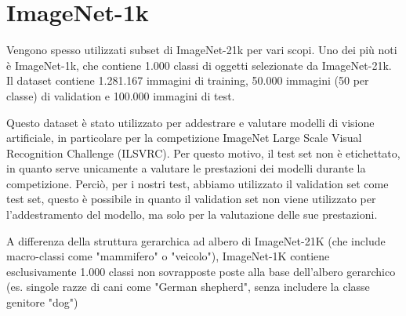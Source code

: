 \section{ImageNet-1k}
Vengono spesso utilizzati subset di ImageNet-21k per vari scopi. 
Uno dei più noti è ImageNet-1k, che contiene 1.000 classi di oggetti selezionate da ImageNet-21k. Il dataset contiene 1.281.167 immagini di training, 50.000 immagini (50 per classe) di validation e 100.000 immagini di test.

Questo dataset è stato utilizzato per addestrare e valutare modelli di visione artificiale, in particolare per la competizione ImageNet Large Scale Visual Recognition Challenge (ILSVRC). Per questo motivo, il test set non è etichettato, in quanto serve unicamente a valutare le prestazioni dei modelli durante la competizione. Perciò, per i nostri test, abbiamo utilizzato il validation set come test set, questo è possibile in quanto il validation set non viene utilizzato per l'addestramento del modello, ma solo per la valutazione delle sue prestazioni\cite{he_deep_2016}.

A differenza della struttura gerarchica ad albero di ImageNet-21K (che include macro-classi come "mammifero" o "veicolo"), ImageNet-1K contiene esclusivamente 1.000 classi non sovrapposte poste alla base dell'albero gerarchico (es. singole razze di cani come "German shepherd", senza includere la classe genitore "dog")

